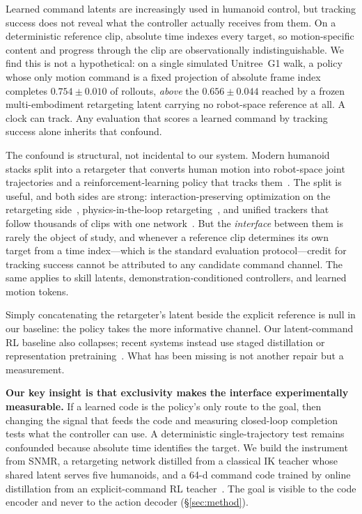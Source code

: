 \documentclass[conference]{IEEEtran}
\newcommand{\snmr}{SNMR}
\begin{document}
Learned command latents are increasingly used in humanoid control, but tracking success
does not reveal what the controller actually receives from them.  On a deterministic
reference clip, absolute time indexes every target, so motion-specific content and
progress through the clip are observationally indistinguishable.  We find this is not a
hypothetical: on a single simulated Unitree~G1 walk, a policy whose only motion command
is a fixed projection of absolute frame index completes $0.754\pm0.010$ of rollouts,
\emph{above} the $0.656\pm0.044$ reached by a frozen multi-embodiment retargeting latent
carrying no robot-space reference at all.  A clock can track.  Any evaluation that scores
a learned command by tracking success alone inherits that confound.

The confound is structural, not incidental to our system.  Modern humanoid stacks split
into a retargeter that converts human motion into robot-space joint trajectories and a
reinforcement-learning policy that tracks them~\cite{deepmimic}.  The split is useful, and
both sides are strong: interaction-preserving optimization on the retargeting
side~\cite{omniretarget}, physics-in-the-loop retargeting~\cite{reactor}, and unified
trackers that follow thousands of clips with one network~\cite{beyondmimic,gmt}.  But the
\emph{interface} between them is rarely the object of study, and whenever a reference
clip determines its own target from a time index---which is the standard evaluation
protocol---credit for tracking success cannot be attributed to any candidate command
channel.  The same applies to skill latents, demonstration-conditioned controllers, and
learned motion tokens.

Simply concatenating the retargeter's latent beside the explicit reference is null in our
baseline: the policy takes the more informative channel.  Our latent-command RL baseline
also collapses; recent systems instead use staged distillation or representation
pretraining~\cite{unitracker,bfm}.  What has been missing is not another repair but a
measurement.

\textbf{Our key insight is that exclusivity makes the interface experimentally
measurable.}  If a learned code is the policy's only route to the goal, then changing the
signal that feeds the code and measuring closed-loop completion tests what the controller
can use.  A deterministic single-trajectory test remains confounded because absolute
time identifies the target.  We build the instrument from \snmr{}, a retargeting network
distilled from a classical IK teacher whose shared latent serves five humanoids, and a
64-d command code trained by online distillation from an explicit-command RL
teacher~\cite{dagger}.
The goal is visible to the code encoder and never to the action decoder
(\S\ref{sec:method}).
\end{document}
